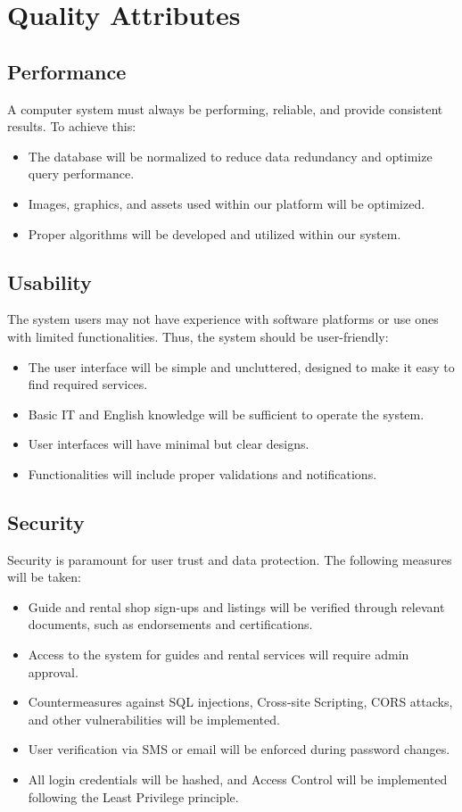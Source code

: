\section{Quality Attributes}

\subsection{Performance}
A computer system must always be performing, reliable, and provide consistent results. To achieve this:

\begin{itemize}
\itemsep0em 
    \item The database will be normalized to reduce data redundancy and optimize query performance.
    \item Images, graphics, and assets used within our platform will be optimized.
    \item Proper algorithms will be developed and utilized within our system.
\end{itemize}

\subsection{Usability}
The system users may not have experience with software platforms or use ones with limited functionalities. Thus, the system should be user-friendly:

\begin{itemize}
\itemsep0em 
    \item The user interface will be simple and uncluttered, designed to make it easy to find required services.
    \item Basic IT and English knowledge will be sufficient to operate the system.
    \item User interfaces will have minimal but clear designs.
    \item Functionalities will include proper validations and notifications.
\end{itemize}

\subsection{Security}
Security is paramount for user trust and data protection. The following measures will be taken:

\begin{itemize}
\itemsep0em 
    \item Guide and rental shop sign-ups and listings will be verified through relevant documents, such as endorsements and certifications.
    \item Access to the system for guides and rental services will require admin approval.
    \item Countermeasures against SQL injections, Cross-site Scripting, CORS attacks, and other vulnerabilities will be implemented.
    \item User verification via SMS or email will be enforced during password changes.
    \item All login credentials will be hashed, and Access Control will be implemented following the Least Privilege principle.
\end{itemize}

